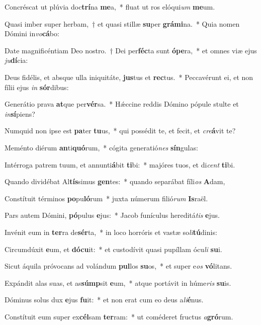\item Concréscat ut plúvia doc\textbf{trí}na \textbf{me}a,~* fluat ut ros elóqui\textit{um} \textbf{me}um.
\item Quasi imber super herbam,~† et quasi stillæ \textbf{su}per \textbf{grá}\textbf{mi}na.~* Quia nomen Dómini in\textit{vo}\textbf{cá}bo:
\item Date magnificéntiam Deo nostro.~† Dei per\textbf{féc}ta sunt \textbf{ó}\textbf{pe}ra,~* et omnes viæ ejus \textit{ju}\textbf{dí}cia:
\item Deus fidélis, et absque ulla iniquitáte, \textbf{jus}tus et \textbf{rec}tus.~* Peccavérunt ei, et non fílii ejus \textit{in} \textbf{sór}dibus:
\item Generátio prava \textbf{at}que per\textbf{vér}sa.~* Hǽccine reddis Dómino pópule stulte et \textit{in}\textbf{sí}piens?
\item Numquid non ipse est \textbf{pa}ter \textbf{tu}us,~* qui possédit te, et fecit, et \textit{cre}\textbf{á}vit te?
\item Meménto diérum \textbf{an}ti\textbf{quó}rum,~* cógita generatió\textit{nes} \textbf{sín}gulas:
\item Intérroga patrem tuum, et annunti\textbf{á}bit \textbf{ti}bi:~* majóres tuos, et di\textit{cent} \textbf{ti}bi.
\item Quando dividébat Al\textbf{tís}simus \textbf{gen}tes:~* quando separábat fíli\textit{os} \textbf{A}dam,
\item Constítuit términos \textbf{po}pu\textbf{ló}rum~* juxta númerum filió\textit{rum} \textbf{Is}raël.
\item Pars autem Dómini, \textbf{pó}pulus \textbf{e}jus:~* Jacob funículus hereditá\textit{tis} \textbf{e}jus.
\item Invénit eum in \textbf{ter}ra de\textbf{sér}ta,~* in loco horróris et vastæ so\textit{li}\textbf{tú}dinis:
\item Circumdúxit \textbf{e}um, et \textbf{dó}\textbf{cu}it:~* et custodívit quasi pupíllam ócu\textit{li} \textbf{su}i.
\item Sicut áquila próvocans ad volándum \textbf{pul}los \textbf{su}os,~* et super e\textit{os} \textbf{vó}litans.
\item Expándit alas suas, et as\textbf{súmp}sit \textbf{e}um,~* atque portávit in húme\textit{ris} \textbf{su}is.
\item Dóminus solus dux \textbf{e}jus \textbf{fu}it:~* et non erat cum eo deus a\textit{li}\textbf{é}nus.
\item Constítuit eum super ex\textbf{cél}sam \textbf{ter}ram:~* ut coméderet fructus \textit{a}\textbf{gró}rum.
